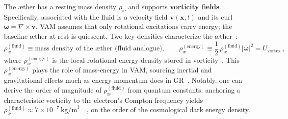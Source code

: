 \documentclass[preprint]{revtex4-2}
\begin{document}
    The æther has a resting mass density $\rho_{\text{\ae}}$ and supports \textbf{vorticity fields}. Specifically, associated with the fluid is a velocity field $\mathbf{v}(\mathbf{x},t)$ and its curl $\boldsymbol{\omega} = \nabla \times \mathbf{v}$. VAM assumes that only rotational excitations carry energy; the baseline æther at rest is quiescent. Two key densities characterize the æther~\cite{reference_17}:
    \begin{equation}
        \rho_{\text{\ae}}^{(\text{fluid})} \equiv \text{mass density of the æther (fluid analogue)}, \qquad
        \rho_{\text{\ae}}^{(\text{energy})} \equiv \frac{1}{2}\,\rho_{\text{\ae}}^{(\text{fluid})} |\boldsymbol{\omega}|^2 = U_{\text{vortex}}\,,
        \label{eq:aether-densities}
    \end{equation}
    where $\rho_{\text{\ae}}^{(\text{energy})}$ is the local rotational energy density stored in vorticity~\cite{reference_18}. This $\rho_{\text{\ae}}^{(\text{energy})}$ plays the role of mass-energy in VAM, sourcing inertial and gravitational effects much as energy-momentum does in GR~\cite{reference_19}. Notably, one can derive the order of magnitude of $\rho_{\text{\ae}}^{(\text{fluid})}$ from quantum constants: anchoring a characteristic vorticity to the electron’s Compton frequency yields $\rho_{\text{\ae}}^{(\text{fluid})} \approx 7\times 10^{-7}~\text{kg/m}^3$~\cite{reference_20}~\cite{reference_21}, on the order of the cosmological dark energy density.
\end{document}
